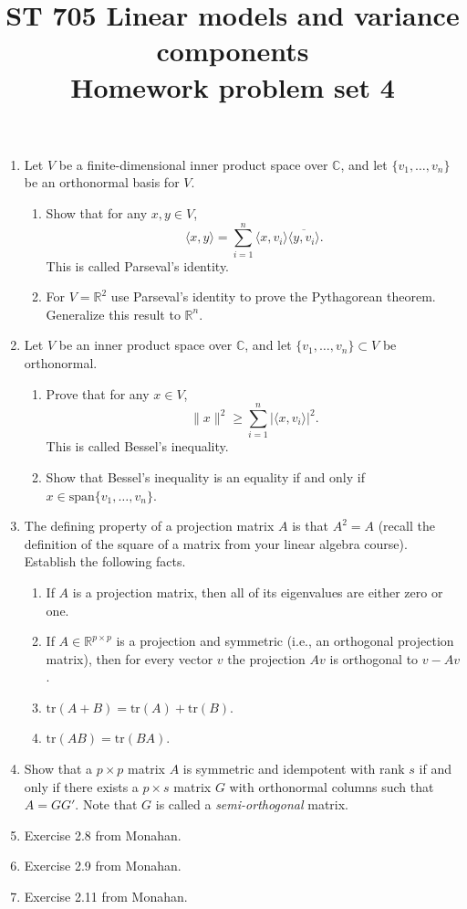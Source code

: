 \documentclass[11pt]{article}
\title{ST 705 Linear models and variance components \\ 
        Homework problem set 4}
\begin{document}
\maketitle

\begin{enumerate}

\item Let $V$ be a finite-dimensional inner product space over $\mathbb{C}$, and let $\{v_{1},\dots,v_{n}\}$ be an orthonormal basis for $V$.  
\begin{enumerate}
\item Show that for any $x,y \in V$,
\[
\langle x,y\rangle = \sum_{i=1}^{n}\langle x,v_{i} \rangle\overline{\langle y,v_{i} \rangle}.
\]
This is called Parseval's identity.
\item For $V = \mathbb{R}^{2}$ use Parseval's identity to prove the Pythagorean theorem.  Generalize this result to $\mathbb{R}^{n}$.
\end{enumerate}

\item Let $V$ be an inner product space over $\mathbb{C}$, and let $\{v_{1},\dots,v_{n}\} \subset V$ be orthonormal.
\begin{enumerate}
\item Prove that for any $x \in V$,
\[
\|x\|^{2} \ge \sum_{i=1}^{n} |\langle x,v_{i}\rangle|^{2}.
\]
This is called Bessel's inequality.
\item Show that Bessel's inequality is an equality if and only if $x \in \text{span}\{v_{1},\dots,v_{n}\}$.
\end{enumerate}  

\item The defining property of a projection matrix $A$ is that $A^{2} = A$ (recall the definition of the square of a matrix from your linear algebra course).  Establish the following facts.
\begin{enumerate}
\item If $A$ is a projection matrix, then all of its eigenvalues are either zero or one. 
\item If $A \in \mathbb{R}^{p\times p}$ is a projection and symmetric (i.e., an orthogonal projection matrix), then for every vector $v$ the projection $Av$ is orthogonal to $v - Av$.
\item $\text{tr}(A + B) = \text{tr}(A) + \text{tr}(B)$.
\item $\text{tr}(AB) = \text{tr}(BA)$.
\end{enumerate}

\item Show that a $p\times p$ matrix $A$ is symmetric and idempotent with rank $s$ if and only if there exists a $p\times s$ matrix $G$ with orthonormal columns such that $A = GG'$.  Note that $G$ is called a {\em semi-orthogonal} matrix.

\item Exercise 2.8 from Monahan.

\item Exercise 2.9 from Monahan.

\item Exercise 2.11 from Monahan.


\end{enumerate}
\end{document}
